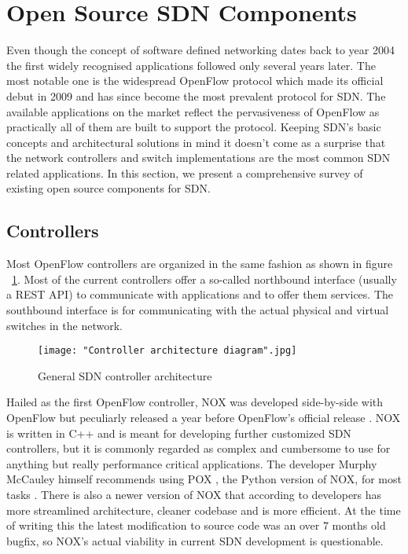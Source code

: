 \section{Open Source SDN Components}

Even though the concept of software defined networking dates back to year 2004 \cite{robert2012system} the first widely recognised applications followed only several years later. The most notable one is the widespread OpenFlow protocol \cite{OpenFlow1.0.0} which made its official debut in 2009 and has since become the most prevalent protocol for SDN.  The available applications on the market reflect the pervasiveness of OpenFlow as practically all of them are built to support the protocol. Keeping SDN’s basic concepts and architectural solutions in mind it doesn’t come as a surprise that the network controllers and switch implementations are the most common SDN related applications. In this section, we present a comprehensive survey of existing open source components for SDN.

\subsection{Controllers}

Most OpenFlow controllers are organized in the same fashion as shown in figure ~\ref{fig:architecture}. Most of the current controllers offer a so-called northbound interface (usually a REST API) to communicate with applications and to offer them services. The southbound interface is for communicating with the actual physical and virtual switches in the network.

\begin{figure}[ht!]
\centering
{}
\texttt{[image: "Controller architecture diagram".jpg]}
\caption{General SDN controller architecture}
\label{fig:architecture}
\end{figure}

	Hailed as the first OpenFlow controller, NOX was developed side-by-side with OpenFlow but peculiarly released a year before OpenFlow’s official release \cite{NOX}. NOX is written in C++ and is meant for developing further customized SDN controllers, but it is commonly regarded as complex and cumbersome to use for anything but really performance critical applications. The developer Murphy McCauley himself recommends using POX \cite{POX}, the Python version of NOX, for most tasks \cite{CHU12}. There is also a newer version of NOX that according to developers has more streamlined architecture, cleaner codebase and is more efficient. At the time of writing this the latest modification to source code was an over 7 months old bugfix, so NOX’s actual viability in current SDN development is questionable.

